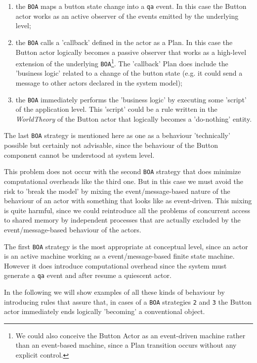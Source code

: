 \begin{enumerate}
\item the \texttt{BOA}  maps a button state change into a \texttt{qa} event. In this case the Button actor works as an active observer of the events emitted by the underlying level;
\item the \texttt{BOA} calls a 'callback' defined in the actor as a Plan. In this case the Button actor logically becomes a passive observer that works as a high-level extension of the underlying \texttt{BOA}\footnote{We could also conceive the Button Actor as an event-driven machine rather than an event-based machine, since a Plan transition occurs without any explicit control.}. The 'callback' Plan does include the 'business logic' related to a change of the button state (e.g. it could send a message to other actors declared in the system model);
\item the \texttt{BOA} immediately performs the 'business logic' by executing some 'script' of the application level. This 'script' could be a rule written in the \textit{WorldTheory} of the Button actor that logically becomes a 'do-nothing' entity.
\end{enumerate}

The last \texttt{BOA} strategy is mentioned here as one as a behaviour 'technically' possible but certainly not advisable, since the behaviour of the Button component cannot be understood at system level. 

This problem does not occur with the second \texttt{BOA} strategy that does minimize computational overheads like the third one. But in this case we must avoid the risk to 'break the model' by mixing the event/message-based nature of the behaviour of an actor with something that looks like as event-driven. This mixing is quite harmful, since we could reintroduce all the problems of concurrent access to shared memory by independent processes that are actually excluded by the event/message-based behaviour of the actors.

The first \texttt{BOA} strategy is the most appropriate at conceptual level, since an actor is an active machine working as a event/message-based finite state machine. However it does introduce computational overhead since the system must generate a \texttt{qa} event and after resume a quiescent actor.

In the following we will show examples of all these kinds of behaviour by introducing rules that assure that, in cases of a \texttt{BOA} strategies \texttt{2} and \texttt{3} the Button actor immediately ends logically 'becoming' a conventional object.

